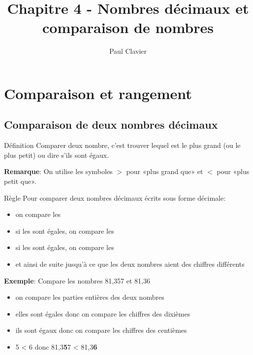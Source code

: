 \documentclass[12pt,a4paper]{article}
\author{Paul Clavier}
\title{Chapitre 4 - Nombres décimaux et comparaison de nombres}
\begin{document}
\renewcommand\thesection{\Roman{section}}
\renewcommand\thesubsection{\arabic{subsection}}


\ifdefined\isprof
	\TeacherModeOn
\fi




\begin{center}
\end{center}

\section{Comparaison et rangement}

\subsection{Comparaison de deux nombres décimaux}

\begin{definition}{Définition}
Comparer deux nombre, c'est trouver lequel est le plus grand (ou le plus petit) ou dire s'ils sont égaux.
\end{definition}

\textbf{Remarque}: On utilise les symboles $>$ pour «plus grand que» et $<$ pour «plus petit que». 

\begin{definition}{Règle}
Pour comparer deux nombres décimaux écrits sous forme décimale:
\begin{itemize}
\item on compare les 
\item si les  sont égales, on compare les 
\item si les  sont égales, on compare les 
\item et ainsi de suite jusqu'à ce que les deux nombres aient des chiffres différents
\end{itemize}
\end{definition}

\textbf{Exemple}: Compare les nombres 81,357 et 81,36
\begin{itemize}
\item on compare les parties entières des deux nombres
\item elles sont égales donc on compare les chiffres des dixièmes
\item ils sont égaux donc on compare les chiffres des centièmes
\item 5 < 6 donc 81,3\textbf{5}7 < 81,3\textbf{6}
\end{itemize} 
\end{document}
